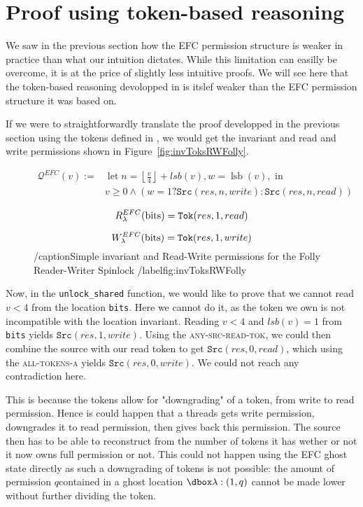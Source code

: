 \section{Proof using token-based reasoning}
We saw in the previous section how the EFC permission structure is weaker in practice than what our intuition dictates. While this limitation can easilly be overcome, it is at the price of slightly less intuitive proofs. We will see here that the token-based reasoning devolopped in \cite{pascal} is itslef weaker than the EFC permission structure it was based on.

If we were to straightforwardly translate the proof developped in the previous section using the tokens defined in \cite{pascal}, we would get the invariant and read and write permissions shown in Figure~\ref{fig:invToksRWFolly}.

\begin{figure}
$$\begin{aligned} \mathcal{Q}^{EFC}(v) :=& \operatorname{let} n=\left\lfloor\frac{v}{4}\right\rfloor + lsb(v), w=\operatorname{lsb}(v), \text { in } \\ & v \geq 0 \wedge (w = 1 ? \texttt{Src}(res, n, write) : \texttt{Src}(res, n, read))
\end{aligned} $$

$$R_{\lambda}^{EFC}(\text{bits}) = \texttt{Tok}(res, 1, read)$$

$$W_{\lambda}^{EFC}(\text{bits}) = \texttt{Tok}(res, 1, write)$$
		/caption{Simple invariant and Read-Write permissions for the Folly Reader-Writer Spinlock}
		/label{fig:invToksRWFolly}
\end{figure}

Now, in the \texttt{unlock\_shared} function, we would like to prove that we cannot read $v < 4$ from the location \texttt{bits}. Here we cannot do it, as the token we own is not incompatible with the location invariant. Reading $v < 4$ and $lsb(v) = 1$ from \texttt{bits} yields $\texttt{Src}(res, 1, write)$. Using the \textsc{any-src-read-tok}, we could then combine the source with our read token to get $\texttt{Src}(res, 0, read)$, which using the \textsc{all-tokens-a} yields $\texttt{Src}(res, 0, write)$. We could not reach any contradiction here.

This is because the tokens allow for "downgrading" of a token, from write to read permission. Hence is could happen that a threads gets write permission, downgrades it to read permission, then gives back this permission. The source then has to be able to reconstruct from the number of tokens it has wether or not it now owns full permission or not. This could not happen using the EFC ghost state directly as such a downgrading of tokens is not possible: the amount of permission $q $contained in a ghost location $\ghost{\lambda : (1, q)}$ cannot be made lower without further dividing the token.

